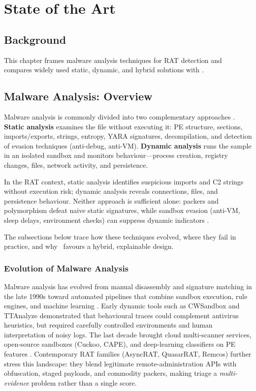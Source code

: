 \chapter{State of the Art}
\label{ch:estado-arte}

\section{Background}

This chapter frames malware analysis techniques for RAT detection and compares widely used
static, dynamic, and hybrid solutions with \rat.

\section{Malware Analysis: Overview}

Malware analysis is commonly divided into two complementary approaches
\cite{skoudis2004,cipriano2019,anderson2012,moser2007}. \textbf{Static analysis} examines the
file without executing it: PE structure, sections, imports/exports, strings, entropy, YARA
signatures, decompilation, and detection of evasion techniques (anti-debug, anti-VM).
\textbf{Dynamic analysis} runs the sample in an isolated sandbox and monitors behaviour---process
creation, registry changes, files, network activity, and persistence.

In the RAT context, static analysis identifies suspicious imports and C2 strings without
execution risk; dynamic analysis reveals connections, files, and persistence behaviour.
Neither approach is sufficient alone: packers and polymorphism defeat naive static signatures,
while sandbox evasion (anti-VM, sleep delays, environment checks) can suppress dynamic
indicators \cite{anderson2012,moser2007,bensaoud2024}.

The subsections below trace how these techniques evolved, where they fail in practice, and why
\rat\ favours a hybrid, explainable design.

\subsection{Evolution of Malware Analysis}

Malware analysis has evolved from manual disassembly and signature matching in the late 1990s
toward automated pipelines that combine sandbox execution, rule engines, and machine learning
\cite{skoudis2004,bayer2006,willems2007}. Early dynamic tools such as CWSandbox and TTAnalyze
demonstrated that behavioural traces could complement antivirus heuristics, but required
carefully controlled environments and human interpretation of noisy logs. The last decade brought
cloud multi-scanner services, open-source sandboxes (Cuckoo, CAPE), and deep-learning classifiers
on PE features \cite{raff2018,ucci2019,khan2024,maniriho2023}. Contemporary RAT families (AsyncRAT, QuasarRAT, Remcos)
further stress this landscape: they blend legitimate remote-administration APIs with obfuscation,
staged payloads, and commodity packers, making triage a \emph{multi-evidence} problem rather than
a single score.


